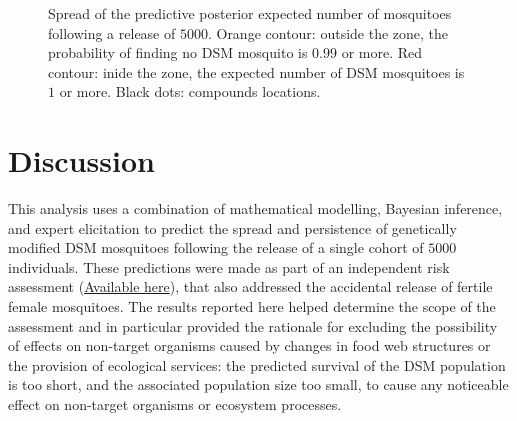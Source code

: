 \documentclass[]{bmcart}
\begin{document}
\begin{figure}[t]
\caption[Spread of the expected number of mosquitoes following a release of $5000$. Orange contour: outside the zone, the probablity of finding no DSM mosquito is $0.99$ or more. Red contour: inide the range, the expected number of DSM mosquito is $1$ or more.]{Spread of the predictive posterior expected number of mosquitoes following a release of $5000$. Orange contour: outside the zone, the probability of finding no DSM mosquito is $0.99$ or more. Red contour: inide the zone, the expected number of DSM mosquitoes is $1$ or more. Black dots: compounds locations.}\label{fig:plotSpread}
\end{figure}

\section{Discussion}
This analysis uses a combination of mathematical modelling, Bayesian inference, and expert elicitation to predict the spread and persistence of genetically modified DSM mosquitoes following the release of a single cohort of $5000$ individuals. These predictions were made as part of an independent risk assessment \citep{Hayes2015a, Hayes2018}(\href{https://targetmalaria.org/resources/library/?category=risks_and-assessments}{Available here}), that also addressed the accidental release of fertile female mosquitoes. The results reported here helped determine the scope of the assessment and in particular provided the rationale for excluding the possibility of effects on non-target organisms caused by changes in food web structures or the provision of ecological services: the predicted survival of the DSM population is too short, and the associated population size too small, to cause any noticeable effect on non-target organisms or ecosystem processes.
\end{document}
